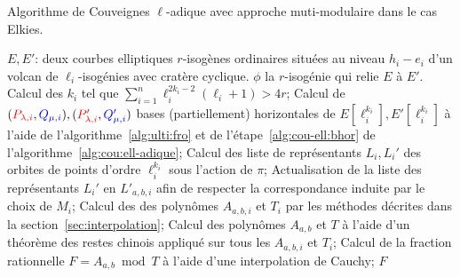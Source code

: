 \documentclass[10pt,a4paper]{book}
\theoremstyle{plain}
\theoremstyle{definition}
\theoremstyle{definition}
\theoremstyle{definition}
\theoremstyle{definition}
\theoremstyle{remark}
\theoremstyle{remark}
\theoremstyle{definition}
\begin{document}
\begin{algorithm}
\caption{\label{alg:cou:mult-adique:short} Algorithme de Couveignes $\ell$-adique avec approche muti-modulaire dans le cas Elkies.}
\begin{algorithmic}[1]
\REQUIRE $E,E'$: deux courbes elliptiques $r$-isogènes ordinaires situées au niveau $h_i-e_i$ d'un volcan de $\ell_i$-isogénies avec cratère cyclique.
\ENSURE $\phi$ la $r$-isogénie qui relie $E$ à $E'$.
\STATE Calcul des $k_i$ tel que $\sum_{i=1}^n\ell_{i}^{2k_{i}-2}(\ell_{i}+1)>4r$;
\STATE \label{alg:mult-ell:bhor} Calcul de $(\color{red}P_{\lambda,i}\color{black},\color{blue}Q_{\mu,i}\color{black}),(\color{red}P'_{\lambda,i}\color{black},\color{blue}Q_{\mu,i}'\color{black})$ bases (partiellement) horizontales de $E[\ell_i^{k_i}],E'[\ell_i^{k_i}]$ à l'aide de l'algorithme~\ref{alg:ulti:fro} et de l'étape~\ref{alg:cou-ell:bhor} de l'algorithme~\ref{alg:cou:ell-adique};
\STATE \label{alg:mult-ell:rep} Calcul des liste de représentants $L_i,L_i'$ des orbites de points d'ordre $\ell_i^{k_i}$ sous l'action de $\pi$;
\ENDFOR
{}
\STATE \label{alg:mult-ell:ord} Actualisation de la liste des représentants $L_i'$ en $L'_{a,b,i}$ afin de respecter la correspondance induite par le choix de $M_i$;
\STATE \label{alg:mult-ell:int} Calcul des des polynômes $A_{a,b,i}$ et $T_i$ par les méthodes décrites dans la section~\ref{sec:interpolation};
\ENDFOR
\STATE Calcul des polynômes $A_{a,b}$ et $T$ à l'aide d'un théorème des restes chinois appliqué sur tous les $A_{a,b,i}$ et $T_i$;
\STATE \label{alg:mult-ell:Cauchy} Calcul de la fraction rationnelle $F=A_{a,b} \bmod T$ à l'aide d'une interpolation de Cauchy;
\RETURN $F$
\ENDIF
\ENDFOR 
\end{algorithmic}
\end{algorithm}
\end{document}
